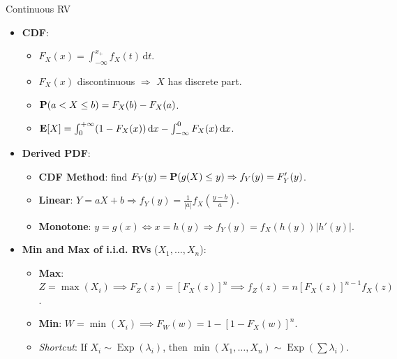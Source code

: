 \documentclass[landscape,a4paper]{article}
\begin{document}
\begin{cheatsheetcolumns}
\begin{card}{Continuous RV}
\begin{itemize}
\begin{itemize}
\begin{itemize}
						\item $F_\Lambda(\lambda)=\varPhi(\lambda),\Lambda\sim N(0,1)$.
						\item $\EE[X]=\mu$,
						\item $\EE[X^2]=\mu^2+\sigma^2$,
						\item $\EE[X^4]=3\sigma^4+6\sigma^2\mu^2+\mu^4$,
						\item $\var[X]=\sigma^2$.
						\item $Y=\alpha X+\beta\sim N(\alpha\mu+\beta,\alpha^2\sigma^2)$.
					\end{itemize}
				\end{itemize}
				\item \textbf{CDF}:\begin{itemize}
					\item $F_X(x)=\int_{-\infty}^{x_+} f_X(t)\,\mathrm dt$.
					\item $F_X(x)$ discontinuous $\Rightarrow$ $X$ has discrete part.
					\item $\mathbf{P}(a<X\le b)=F_X(b)-F_X(a)$.
					\item $\mathbf{E}[X]=\int_0^{+\infty}(1-F_X(x))\,\mathrm dx-\int_{-\infty}^0F_X(x)\,\mathrm dx$.
				\end{itemize}
				\item \textbf{Derived PDF}:
				\begin{itemize}
					\item \textbf{CDF Method}: find $F_Y(y)=\mathbf{P}(g(X)\le y)\Rightarrow f_Y(y)=F_Y'(y)$.
					\item \textbf{Linear}: $Y=aX+b\Rightarrow f_Y(y)=\frac{1}{|a|}f_X\left(\frac{y-b}{a}\right)$.
					\item \textbf{Monotone}: $y=g(x)\Leftrightarrow x=h(y)\Rightarrow f_Y(y)=f_X(h(y))|h'(y)|$.
				\end{itemize}
				
				\item \textbf{Min and Max of i.i.d. RVs} ($X_1, \dots, X_n$):
				\begin{itemize}
					\item \textbf{Max}: $Z = \max(X_i) \implies F_Z(z) = [F_X(z)]^n \implies f_Z(z) = n[F_X(z)]^{n-1} f_X(z)$.
					\item \textbf{Min}: $W = \min(X_i) \implies F_W(w) = 1 - [1 - F_X(w)]^n$.
					\item \textit{Shortcut}: If $X_i \sim \operatorname{Exp}(\lambda_i)$, then $\min(X_1, \dots, X_n) \sim \operatorname{Exp}(\sum \lambda_i)$.
				\end{itemize}
				

\end{itemize}
\end{card}
\end{cheatsheetcolumns}
\end{document}

